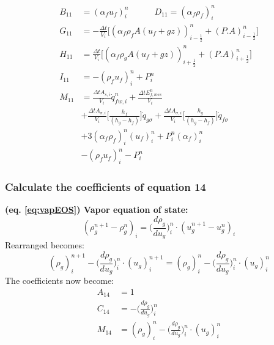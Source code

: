 \documentclass[11pt,letterpaper,titlepage]{article}
\newcommand{\half}{\frac{1}{2}}
\begin{document}
\begin{equation*}
\begin{aligned}
B_{11} & = (\alpha_f u_f)_i^n \quad \quad \quad D_{11} = (\alpha_f\rho_f)_i^n \\
G_{11} & = -\frac{\Delta t}{V_i}\biggr[ (\alpha_f\rho_f A(u_f+gz))_{i-\half}^n 
           +(P.A)_{i-\half}^n  \biggr] \\
H_{11} & =  \frac{\Delta t}{V_i}\biggr[ (\alpha_f\rho_g A(u_f+gz))_{i+\half}^n   
           + (P.A)_{i+\half}^n   \biggr]\\
I_{11} & =-(\rho_f u_f)_i^n + P_i^n \\
M_{11} & = \frac{\Delta tA_{s,i}}{V_i}\dot{q}_{fw,i}^n  
         + \frac{\Delta tE_{f,loss}^n}{V_i}\\
        &+\frac{\Delta tA_{\sigma,i}}{V_i} \biggr[\frac{ h_f  }{(h_g-h_f)}  \biggr]\dot{q}_{g\sigma}
         +\frac{\Delta tA_{\sigma,i}}{V_i} \biggr[\frac{ h_g }{(h_g-h_f)}  \biggr]\dot{q}_{f\sigma}\\
        &+ 3(\alpha_f\rho_f)_i^n (u_f)_i^{n} + P_i^n (\alpha_f)_i^n\\
        &-(\rho_f u_f)_i^n - P_i^n
\end{aligned}
\end{equation*}


\newpage
\subsubsection{Calculate the coefficients of equation 14}
\textbf{(eq. \ref{eq:vapEOS}) Vapor equation of state:}
\begin{equation*} 
(\rho_{g}^{n+1} - \rho_{g}^{n})_i= \biggr( \frac{d\rho_g}{du_g} \biggr)_i^n \cdot (u_{g}^{n+1} - u_{g}^{n})_i
\end{equation*}
\newline
Rearranged becomes:
\begin{equation*} 
(\rho_g)_i^{n+1} - \biggr( \frac{d\rho_g}{du_g} \biggr)_i^n \cdot (u_g)_i^{n+1} = (\rho_g)_i^{n}  - \biggr( \frac{d\rho_g}{du_g} \biggr)_i^n \cdot (u_g)_i^{n} 
\end{equation*}
The coefficients now become:
\begin{equation*}
\begin{aligned}
A_{14} & = 1 \\
C_{14} & = - \biggr( \frac{d\rho_g}{du_g} \biggr)_i^n \\
M_{14} & = (\rho_g)_i^{n}  - \biggr( \frac{d\rho_g}{du_g} \biggr)_i^n \cdot (u_g)_i^{n}
\end{aligned}
\end{equation*}
\end{document}
